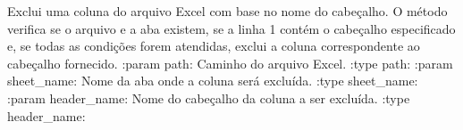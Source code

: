 \documentclass[letterpaper,10pt,english]{sphinxmanual}
\begin{document}

\begin{fulllineitems}
\label{\detokenize{api/excel_io:excel_io.delete_column_by_header}}
\pysigstartsignatures
\pysiglinewithargsret
{}
{\sphinxparamcomma {}\sphinxparamcomma {}}
{}
\pysigstopsignatures
\sphinxAtStartPar
Exclui uma coluna do arquivo Excel com base no nome do cabeçalho. O método verifica se o arquivo e a aba existem, se a linha 1 contém o cabeçalho especificado e, se todas as condições forem atendidas, exclui a coluna correspondente ao cabeçalho fornecido.
:param path: Caminho do arquivo Excel.
:type path: 
:param sheet\_name: Nome da aba onde a coluna será excluída.
:type sheet\_name: 
:param header\_name: Nome do cabeçalho da coluna a ser excluída.
:type header\_name: 
\begin{quote}\begin{description}
\sphinxAtStartPar
{}

\end{description}\end{quote}

\end{fulllineitems}

\end{document}
